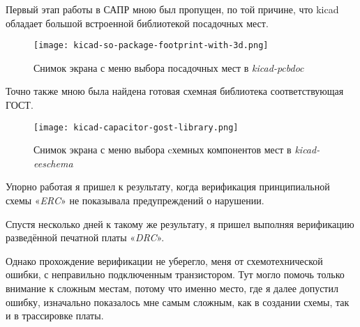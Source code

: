 Первый этап работы в САПР мною был пропущен,
по той причине, что kicad обладает большой встроенной
библиотекой посадочных мест.


\begin{figure}[H]
  \centering
  \texttt{[image: kicad-so-package-footprint-with-3d.png]}
  \caption{Снимок экрана с меню выбора посадочных мест в \textit{kicad-pcbdoc}}
\end{figure}

Точно также мною была найдена готовая
схемная библиотека соответствующая ГОСТ. 

\begin{figure}[H]
  \centering
  \texttt{[image: kicad-capacitor-gost-library.png]}
  \caption{Снимок экрана с меню выбора cхемных компонентов
    мест в \textit{kicad-eeschema}}
\end{figure}


Упорно работая я пришел к результату,
когда верификация принципиальной схемы «\textit{ERC}»
не показывала предупреждений о нарушении.

Спустя несколько дней к такому же результату,
я пришел выполняя верификацию разведённой печатной платы «\textit{DRC}».

Однако прохождение верификации не уберегло,
меня от схемотехнической ошибки,
с неправильно подключенным транзистором.
Тут могло помочь только внимание к сложным местам,
потому что именно место, где я далее допустил ошибку,
изначально показалось мне самым сложным, как в создании схемы,
так и в трассировке платы.

\newpage

